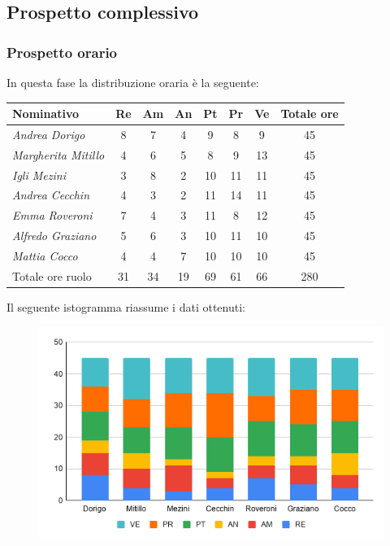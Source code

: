 {{{{{{{{{{{{{{{		\subsection{Prospetto complessivo}\label{PreventivoFaseDiProgettazioneDiDettaglioECodificaComplessivo}
	
			\subsubsection{Prospetto orario}\label{PreventivoFaseDiProgettazioneDiDettaglioECodificaProspettoOrario}
			In questa fase la distribuzione oraria è la seguente:
			\quad
			\def\tabularxcolumn#1{m{#1}}
			{
				
				\begin{center}
					\renewcommand{\arraystretch}{1.4}
					\begin{tabularx}{\textwidth}{|X|c|c|c|c|c|c|c|}
						\hline
						\rowcolor{airforceblue}
						\textbf{Nominativo} & \textbf{Re} & \textbf{Am} & \textbf{An} & \textbf{Pt} & \textbf{Pr} & \textbf{Ve} & \textbf{Totale ore}\\
						\hline
						\textit{Andrea Dorigo} & 8 & 7 & 4 & 9 & 8 & 9 & 45\\
						\hline
						\textit{Margherita Mitillo} & 4 & 6 & 5 & 8 & 9 & 13 & 45\\
						\hline
						\textit{Igli Mezini} & 3 & 8 & 2 & 10 & 11 & 11 & 45\\
						\hline
						\textit{Andrea Cecchin} & 4 & 3 & 2 & 11 & 14 & 11 & 45\\
						\hline
						\textit{Emma Roveroni} & 7 & 4 & 3 & 11 & 8 & 12 & 45\\
						\hline
						\textit{Alfredo Graziano} & 5 & 6 & 3 & 10 & 11 & 10 & 45\\
						\hline
						\textit{Mattia Cocco} & 4 & 4 & 7 & 10 & 10 & 10 & 45\\
						\hline
						Totale ore ruolo & 31 & 34 & 19 & 69 & 61 & 66 & 280\\
						\hline
					\end{tabularx}
				\end{center}
				Il seguente istogramma riassume i dati ottenuti:
				\begin{figure}[!h]
					\begin{center}
						\includegraphics[width=0.7\linewidth]{../immagini/pdp/istogramma_progettazione_dettaglio.png}

\end{center}
\end{figure}}}}}}}}}}}}}}}}}

